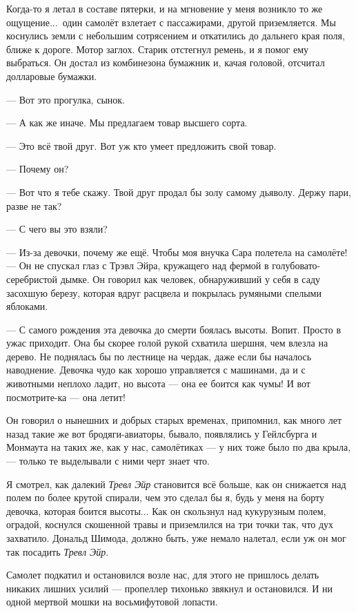 Когда-то я летал в составе пятерки, и на мгновение у меня возникло то же ощущение...\ один самолёт взлетает с пассажирами, другой приземляется. Мы коснулись земли с небольшим сотрясением и откатились до дальнего края поля, ближе к дороге. Мотор заглох. Старик отстегнул ремень, и я помог ему выбраться. Он достал из комбинезона бумажник и, качая головой, отсчитал долларовые бумажки.

--- Вот это прогулка, сынок.

--- А как же иначе. Мы предлагаем товар высшего сорта.

--- Это всё твой друг. Вот уж кто умеет предложить свой товар.

--- Почему он?

--- Вот что я тебе скажу. Твой друг продал бы золу самому дьяволу. Держу пари, разве не так?

--- С чего вы это взяли?

--- Из-за девочки, почему же ещё. Чтобы моя внучка Сара полетела на самолёте! --- Он не спускал глаз с Трэвл Эйра, кружащего над фермой в голубовато-серебристой дымке. Он говорил как человек, обнаруживший у себя в саду засохшую березу, которая вдруг расцвела и покрылась румяными спелыми яблоками.

--- С самого рождения эта девочка до смерти боялась высоты. Вопит. Просто в ужас приходит. Она бы скорее голой рукой схватила шершня, чем влезла на дерево. Не поднялась бы по лестнице на чердак, даже если бы началось наводнение. Девочка чудо как хорошо управляется с машинами, да и с животными неплохо ладит, но высота --- она ее боится как чумы! И вот посмотрите-ка --- она летит!

Он говорил о нынешних и добрых старых временах, припомнил, как много лет назад такие же вот бродяги-авиаторы, бывало, появлялись у Гейлсбурга и Монмаута на таких же, как у нас, самолётиках --- у них тоже было по два крыла, --- только те выделывали с ними черт знает что.

Я смотрел, как далекий {\it Тревл Эйр\/} становится всё больше, как он снижается над полем по
более крутой спирали, чем это сделал бы я, будь у меня на борту девочка, которая боится высоты...
Как он скользнул над кукурузным полем, оградой, коснулся скошенной травы и приземлился на три
точки так, что дух захватило. Дональд Шимода, должно быть, уже немало налетал, если уж он мог так
посадить {\it Тревл Эйр}.

Самолет подкатил и остановился возле нас, для этого не пришлось делать никаких лишних усилий --- пропеллер тихонько звякнул и остановился. И ни одной мертвой мошки на восьмифутовой лопасти.

